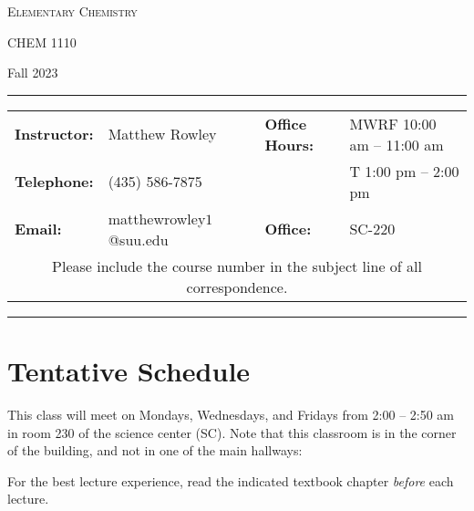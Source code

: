 \documentclass[12pt, letterpaper]{article}
\begin{document}
\begin{center}
	{\Large \textsc{Elementary Chemistry}}
	
	CHEM 1110
\end{center}
\begin{center}
	{\large Fall 2023}
\end{center}
\begin{center}
	\rule{0.99\textwidth}{0.4pt}
	\begin{tabular}{llcll}
		\textbf{Instructor:} & Matthew Rowley           &  & \textbf{Office Hours:} & MWRF 10:00 am -- 11:00 am \\
		\textbf{Telephone:}  & (435) 586-7875           &  &                        & T 1:00 pm -- 2:00 pm    \\
		\textbf{Email:}      & matthewrowley$1$@suu.edu &  & \textbf{Office:}       & SC-220                   \\
		\multicolumn{5}{c}{Please include the course number in the subject line of all correspondence.}
	\end{tabular}
	\rule{0.99\textwidth}{0.4pt}
\end{center}


\section*{Tentative Schedule}
This class will meet on Mondays, Wednesdays, and Fridays from 2:00  -- 2:50
am in room 230 of the science center (SC). Note that this classroom is in the corner of the building, and not in one of the main hallways:

\noindent For the best lecture experience, read the indicated textbook chapter \emph{before} each lecture.
\end{document}
